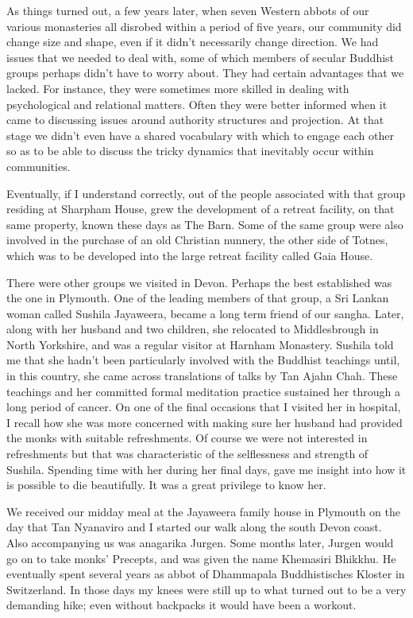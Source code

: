 As things turned out, a few years later, when seven Western abbots of
our various monasteries all disrobed within a period of five years, our
community did change size and shape, even if it didn't necessarily
change direction. We had issues that we needed to deal with, some of
which members of secular Buddhist groups perhaps didn't have to worry
about. They had certain advantages that we lacked. For instance, they
were sometimes more skilled in dealing with psychological and relational
matters. Often they were better informed when it came to discussing
issues around authority structures and projection. At that stage we
didn't even have a shared vocabulary with which to engage each other so
as to be able to discuss the tricky dynamics that inevitably occur
within communities.

Eventually, if I understand correctly, out of the people associated with
that group residing at Sharpham House, grew the development of a retreat
facility, on that same property, known these days as The Barn\cite{barn}.
Some of the same group were also involved in the
purchase of an old Christian nunnery, the other side of Totnes, which
was to be developed into the large retreat facility called Gaia House\cite{gaia}.

There were other groups we visited in Devon. Perhaps the best
established was the one in Plymouth. One of the leading members of that
group, a Sri Lankan woman called Sushila Jayaweera, became a long term
friend of our sangha. Later, along with her husband and two children,
she relocated to Middlesbrough in North Yorkshire, and was a regular
visitor at Harnham Monastery. Sushila told me that she hadn't been
particularly involved with the Buddhist teachings until, in this
country, she came across translations of talks by Tan Ajahn Chah. These
teachings and her committed formal meditation practice sustained her
through a long period of cancer. On one of the final occasions that I visited
her in hospital, I recall how she was more concerned with making sure
her husband had provided the monks with suitable refreshments. Of course
we were not interested in refreshments but that was characteristic of
the selflessness and strength of Sushila. Spending time with her during
her final days, gave me insight into how it is possible to die
beautifully. It was a great privilege to know her.

We received our midday meal at the Jayaweera family house in Plymouth on
the day that Tan Nyanaviro and I started our walk along the south Devon
coast. Also accompanying us was anagarika Jurgen. Some months later,
Jurgen would go on to take monks' Precepts, and was given the name
Khemasiri Bhikkhu. He eventually spent several years as abbot of
Dhammapala Buddhistisches Kloster\cite{dhammapala}
in Switzerland. In those days my knees were still up
to what turned out to be a very demanding hike; even without backpacks
it would have been a workout.

